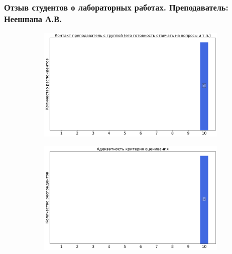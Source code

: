     \subsubsection{Отзыв студентов о лабораторных работах. Преподаватель: Неешпапа А.В.}
        \begin{figure}[H]
            \centering
            \begin{subfigure}[b]{0.45\textwidth}
                \centering
                \includegraphics[width=\textwidth]{images/2 course/Радиотехнические цепи и сигналы/labniks-marks-Неешпапа А.В.-0.png}
            \end{subfigure}
            \begin{subfigure}[b]{0.45\textwidth}
                \centering
                \includegraphics[width=\textwidth]{images/2 course/Радиотехнические цепи и сигналы/labniks-marks-Неешпапа А.В.-1.png}
            \end{subfigure}
            \begin{subfigure}[b]{0.45\textwidth}
                \centering

\end{subfigure}
\end{figure}
